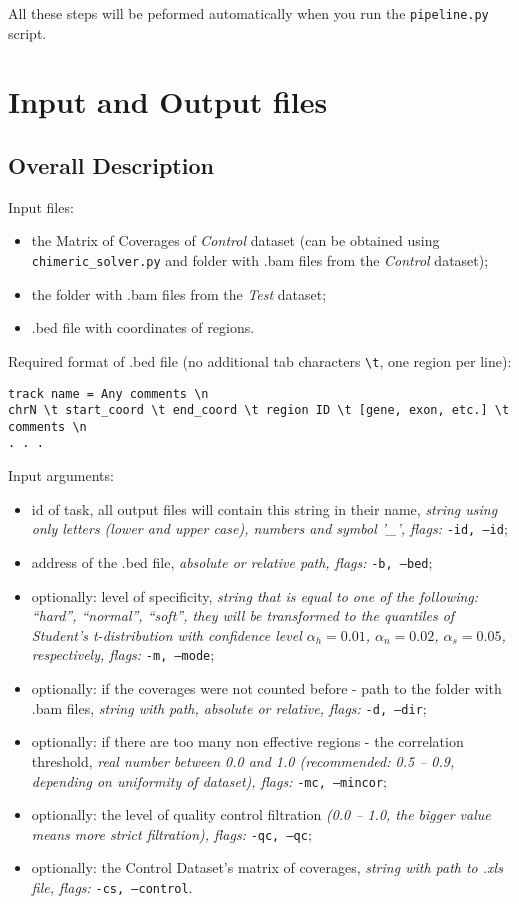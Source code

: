 \documentclass{article}
\begin{document}
All these steps will be peformed automatically when you run the \texttt{pipeline.py} script.

\newpage

\section{Input and Output files}

\subsection{Overall Description}

{\Large Input files:}
\begin{itemize}
\item the Matrix of Coverages of {\it Control} dataset (can be obtained using \texttt{chimeric\_solver.py} and folder with .bam files from the {\it Control} dataset);
\item the folder with .bam files from the {\it Test} dataset;
\item .bed file with coordinates of regions.
\end{itemize}

Required format of .bed file (no additional tab characters \texttt{\textbackslash t}, one region per line):
\begin{lstlisting}[style=DOS]
track name = Any comments \n
chrN \t start_coord \t end_coord \t region ID \t [gene, exon, etc.] \t comments \n
. . .
\end{lstlisting}

\hfill \break
{\Large Input arguments:}
\begin{itemize}
\item id of task, all output files will contain this string in their name, {\it string using only letters (lower and
upper case), numbers and symbol '\_', flags:} \texttt{-id, --id};
\item address of the .bed file, {\it absolute or relative path, flags:} \texttt{-b, --bed};
\item optionally: level of specificity, {\it string that is equal to one of the following: ``hard'',
 ``normal'', ``soft'',
  they will be transformed to the 
  quantiles of Student's 
  t-distribution with confidence level $\alpha_h = 0.01$, $\alpha_n = 0.02$, $\alpha_s = 0.05$, respectively, flags:} \texttt{-m, --mode};
\item optionally: if the coverages were not counted before - path to the folder with .bam files, {\it string with
path, absolute or relative, flags: } \texttt{-d, --dir};
\item optionally: if there are too many non effective regions - the correlation threshold, {\it real number
between 0.0 and 1.0 (recommended: 0.5 -- 0.9, depending on uniformity of dataset), flags:} \texttt{-mc, --mincor};
\item optionally: the level of quality control filtration {\it(0.0 -- 1.0, the bigger value means more strict filtration), flags:} \texttt{-qc, --qc};
\item optionally: the Control Dataset's matrix of coverages, {\it string with path to .xls file, flags:} \texttt{-cs, --control}.
\end{itemize}
\end{document}
